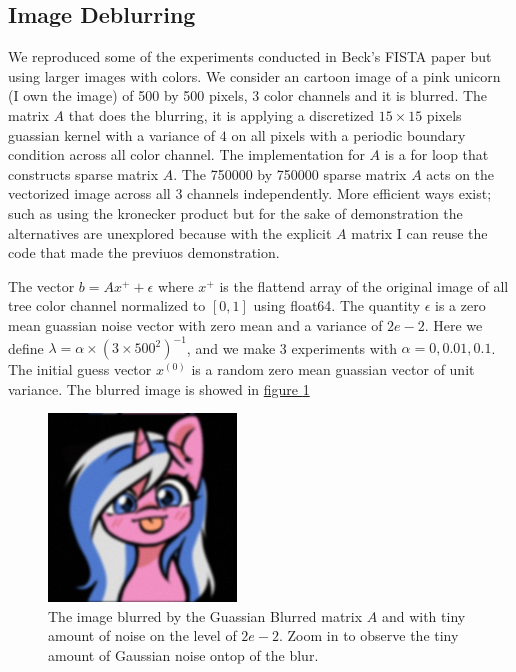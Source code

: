 \documentclass[]{article}
\theoremstyle{definition}
\begin{document}
    \subsection*{Image Deblurring}
        We reproduced some of the experiments conducted in Beck's FISTA paper \cite{paper:FISTA} but using larger images with colors. We consider an cartoon image of a pink unicorn (I own the image) of 500 by 500 pixels, 3 color channels and it is blurred. The matrix $A$ that does the blurring, it is applying a discretized $15\times 15$ pixels guassian kernel with a variance of $4$ on all pixels with a periodic boundary condition across all color channel. The implementation for $A$ is a for loop that constructs sparse matrix $A$. The 750000 by 750000 sparse matrix $A$ acts on the vectorized image across all 3 channels independently. More efficient ways exist; such as using the kronecker product but for the sake of demonstration the alternatives are unexplored because with the explicit $A$ matrix I can reuse the code that made the previuos demonstration. 
        \par
        The vector $b = Ax^+ + \epsilon$ where $x^+$ is the flattend array of the original image of all tree color channel normalized to $[0, 1]$ using float64. The quantity $\epsilon$ is a zero mean guassian noise vector with zero mean and a variance of $2e-2$. Here we define $\lambda = \alpha\times (3\times500^2)^{-1}$, and we make 3 experiments with $\alpha = 0, 0.01, 0.1$. The initial guess vector $x^{(0)}$ is a random zero mean guassian vector of unit variance. The blurred image is showed in \hyperref[fig:blurred_alto]{figure \ref*{fig:blurred_alto}}
        \begin{figure}[H]
            \centering
            \includegraphics*[width=5cm]{blurred_img.jpg}
            \caption{The image blurred by the Guassian Blurred matrix $A$ and with tiny amount of noise on the level of $2e-2$. Zoom in to observe the tiny amount of Gaussian noise ontop of the blur.}
            \label{fig:blurred_alto}
        \end{figure}
\end{document}
